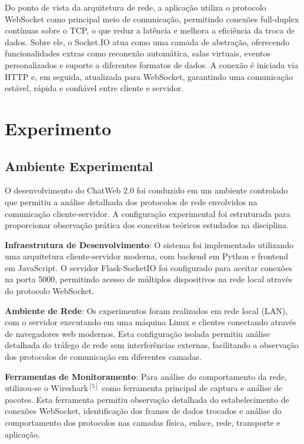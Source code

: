 \documentclass[conference,compsoc]{IEEEtran}
\begin{document}
\begin{otherlanguage}{brazil}
Do ponto de vista da arquitetura de rede, a aplicação utiliza o protocolo WebSocket como principal meio de comunicação, permitindo conexões full-duplex contínuas sobre o TCP, o que reduz a latência e melhora a eficiência da troca de dados. Sobre ele, o Socket.IO atua como uma camada de abstração, oferecendo funcionalidades extras como reconexão automática, salas virtuais, eventos personalizados e suporte a diferentes formatos de dados. A conexão é iniciada via HTTP e, em seguida, atualizada para WebSocket, garantindo uma comunicação estável, rápida e confiável entre cliente e servidor.

\section{Experimento}

\subsection{Ambiente Experimental}

O desenvolvimento do ChatWeb 2.0 foi conduzido em um ambiente controlado que permitiu a análise detalhada dos protocolos de rede envolvidos na comunicação cliente-servidor. A configuração experimental foi estruturada para proporcionar observação prática dos conceitos teóricos estudados na disciplina.

\textbf{Infraestrutura de Desenvolvimento}:
O sistema foi implementado utilizando uma arquitetura cliente-servidor moderna, com backend em Python e frontend em JavaScript. O servidor Flask-SocketIO foi configurado para aceitar conexões na porta 5000, permitindo acesso de múltiplos dispositivos na rede local através do protocolo WebSocket.

\textbf{Ambiente de Rede}:
Os experimentos foram realizados em rede local (LAN), com o servidor executando em uma máquina Linux e clientes conectando através de navegadores web modernos. Esta configuração isolada permitiu análise detalhada do tráfego de rede sem interferências externas, facilitando a observação dos protocolos de comunicação em diferentes camadas.

\textbf{Ferramentas de Monitoramento}:
Para análise do comportamento da rede, utilizou-se o Wireshark$^{[5]}$ como ferramenta principal de captura e análise de pacotes. Esta ferramenta permitiu observação detalhada do estabelecimento de conexões WebSocket, identificação dos frames de dados trocados e análise do comportamento dos protocolos nas camadas física, enlace, rede, transporte e aplicação.


\end{otherlanguage}
\end{document}

